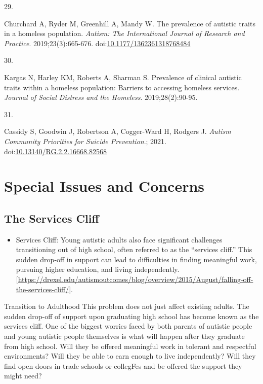 \documentclass[
  letterpaper,
  DIV=11,
  numbers=noendperiod]{scrreprt}
\providecommand{\tightlist}{%
  \setlength{\itemsep}{0pt}\setlength{\parskip}{0pt}}\usepackage{longtable,booktabs,array}
\newlength{\cslhangindent}
\newlength{\csllabelwidth}
\newenvironment{CSLReferences}[2] %
 {\begin{list}{}{%
  \setlength{\itemindent}{0pt}
  \setlength{\leftmargin}{0pt}
  \setlength{\parsep}{0pt}
  \ifodd #1
   \setlength{\leftmargin}{\cslhangindent}
   \setlength{\itemindent}{-1\cslhangindent}
  \fi
  \setlength{\itemsep}{#2\baselineskip}}}
 {\end{list}}
\newcommand{\CSLLeftMargin}[1]{\parbox[t]{\csllabelwidth}{\strut#1\strut}}
\newcommand{\CSLRightInline}[1]{\parbox[t]{\linewidth - \csllabelwidth}{\strut#1\strut}}
\begin{document}
\begin{CSLReferences}{0}{1}
\CSLLeftMargin{29. }%
\CSLRightInline{Churchard A, Ryder M, Greenhill A, Mandy W. The
prevalence of autistic traits in a homeless population. \emph{Autism:
The International Journal of Research and Practice}. 2019;23(3):665-676.
doi:\href{https://doi.org/10.1177/1362361318768484}{10.1177/1362361318768484}}

\CSLLeftMargin{30. }%
\CSLRightInline{Kargas N, Harley KM, Roberts A, Sharman S. Prevalence of
clinical autistic traits within a homeless population: {Barriers} to
accessing homeless services. \emph{Journal of Social Distress and the
Homeless}. 2019;28(2):90-95.}

\CSLLeftMargin{31. }%
\CSLRightInline{Cassidy S, Goodwin J, Robertson A, Cogger-Ward H,
Rodgers J. \emph{Autism Community Priorities for Suicide Prevention}.;
2021.
doi:\href{https://doi.org/10.13140/RG.2.2.16668.82568}{10.13140/RG.2.2.16668.82568}}

\end{CSLReferences}

\cleardoublepage
{}
{}
\appendix

\chapter{Special Issues and Concerns}\label{special-issues-and-concerns}

\section{The Services Cliff}\label{sec-services_cliff}

\begin{itemize}
\tightlist
\item
  Services Cliff: Young autistic adults also face significant challenges
  transitioning out of high school, often referred to as the ``services
  cliff.'' This sudden drop-off in support can lead to difficulties in
  finding meaningful work, pursuing higher education, and living
  independently.
  {[}\url{https://drexel.edu/autismoutcomes/blog/overview/2015/August/falling-off-the-services-cliff/}{]}.
\end{itemize}

Transition to Adulthood This problem does not just affect existing
adults. The sudden drop-off of support upon graduating high school has
become known as the services cliff. One of the biggest worries faced by
both parents of autistic people and young autistic people themselves is
what will happen after they graduate from high school. Will they be
offered meaningful work in tolerant and respectful environments? Will
they be able to earn enough to live independently? Will they find open
doors in trade schools or collegFes and be offered the support they
might need?
\end{document}

